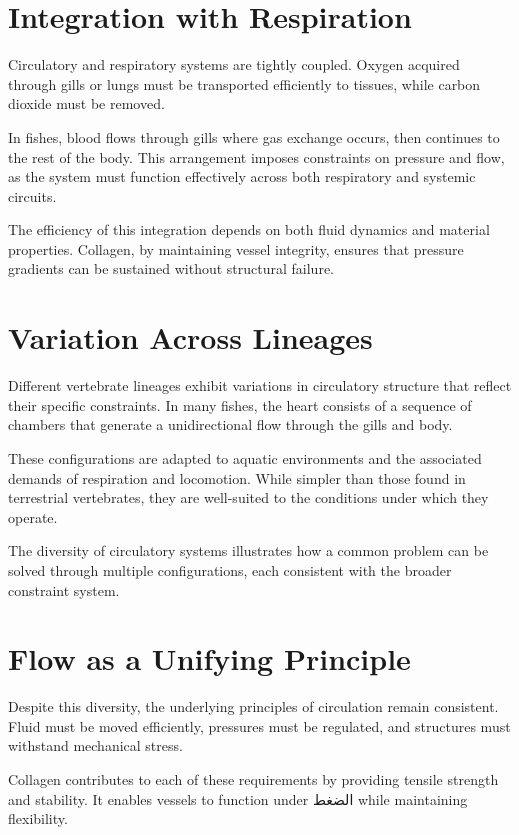 \documentclass[11pt,oneside]{book}
\begin{document}
\section{Integration with Respiration}

Circulatory and respiratory systems are tightly coupled. Oxygen acquired through gills or lungs must be transported efficiently to tissues, while carbon dioxide must be removed.

In fishes, blood flows through gills where gas exchange occurs, then continues to the rest of the body. This arrangement imposes constraints on pressure and flow, as the system must function effectively across both respiratory and systemic circuits.

The efficiency of this integration depends on both fluid dynamics and material properties. Collagen, by maintaining vessel integrity, ensures that pressure gradients can be sustained without structural failure.

\section{Variation Across Lineages}

Different vertebrate lineages exhibit variations in circulatory structure that reflect their specific constraints. In many fishes, the heart consists of a sequence of chambers that generate a unidirectional flow through the gills and body.

These configurations are adapted to aquatic environments and the associated demands of respiration and locomotion. While simpler than those found in terrestrial vertebrates, they are well-suited to the conditions under which they operate.

The diversity of circulatory systems illustrates how a common problem can be solved through multiple configurations, each consistent with the broader constraint system.

\section{Flow as a Unifying Principle}

Despite this diversity, the underlying principles of circulation remain consistent. Fluid must be moved efficiently, pressures must be regulated, and structures must withstand mechanical stress.

Collagen contributes to each of these requirements by providing tensile strength and stability. It enables vessels to function under الضغط while maintaining flexibility.
\end{document}
